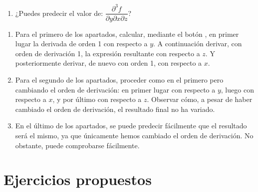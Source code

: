 \begin{enumerate}[leftmargin=*]
\begin{enumerate}
\begin{enumerate}
\item ¿Puedes predecir el valor de: $\dfrac{{\partial ^3 f}}
{{\partial y\partial x\partial z}}$?

\end{enumerate}

\begin{indicacion}
{
\begin{enumerate}

\item Para el primero de los apartados, calcular, mediante el
botón , en primer lugar la derivada de
orden 1 con respecto a $y$. A continuación derivar, con orden de
derivación 1, la expresión resultante con respecto a $z$. Y
posteriormente derivar, de nuevo con orden 1, con respecto a $x$.

\item Para el segundo de los apartados, proceder como en el
primero pero cambiando el orden de derivación: en primer lugar con
respecto a $y$, luego con respecto a $x$, y por último con respecto
a $z$. Observar cómo, a pesar de haber cambiado el orden de
derivación, el resultado final no ha variado.

\item En el último de los apartados, se puede predecir fácilmente
que el resultado será el mismo, ya que únicamente hemos cambiado el
orden de derivación. No obstante, puede comprobarse fácilmente.

\end{enumerate}

}
\end{indicacion}


\end{enumerate}
\end{enumerate}


\section{Ejercicios propuestos}

